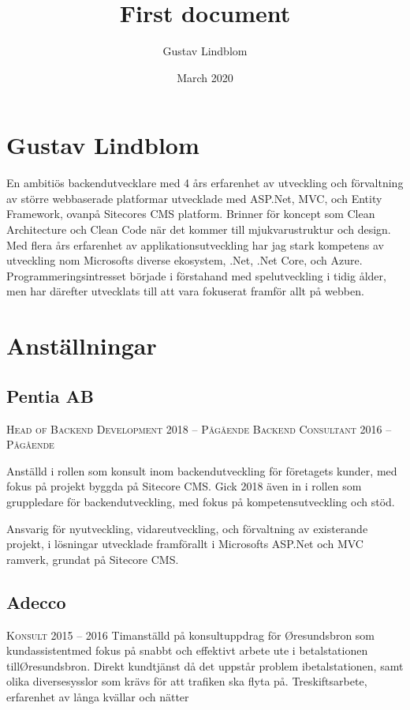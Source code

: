 \documentclass[usenames,dvipsnames]{article}
\title{First document}
\author{Gustav Lindblom}
\date{March 2020}
\begin{document}
\hspace{-1.6cm}\begin{minipage}[t]{0.65\textwidth}

\section*{\textcolor{NavyBlue}{Gustav Lindblom}}
\begin{flushleft}
En ambitiös backendutvecklare med 4 års erfarenhet av utveckling och förvaltning av större webbaserade platformar utvecklade med ASP.Net, MVC, och Entity Framework, ovanpå Sitecores CMS platform. Brinner för koncept som Clean Architecture och Clean Code när det kommer till mjukvarustruktur och design. Med flera års erfarenhet av applikationsutveckling har jag stark kompetens av utveckling nom Microsofts diverse ekosystem, .Net, .Net Core, och Azure.\break
Programmeringsintresset började i förstahand med spelutveckling i tidig ålder, men har därefter utvecklats till att vara fokuserat framför allt på webben.
\end{flushleft}

\section*{\textcolor{NavyBlue}{Anställningar}}
\subsection*{\textcolor{NavyBlue}{Pentia AB}}
\begin{flushleft}
\textsc{Head of Backend Development 2018 -- Pågående}\break
\textsc{Backend Consultant 2016 -- Pågående}\break 
\par Anställd i rollen som konsult inom backendutveckling för företagets kunder, med fokus på projekt byggda på Sitecore CMS. Gick 2018 även in i rollen som gruppledare för backendutveckling, med fokus på kompetensutveckling och stöd.
\par Ansvarig för nyutveckling, vidareutveckling, och förvaltning av existerande projekt, i lösningar utvecklade framförallt i Microsofts ASP.Net och MVC ramverk, grundat på Sitecore CMS.
\end{flushleft}

\subsection*{\textcolor{NavyBlue}{Adecco}}
\begin{flushleft}
\textsc{Konsult 2015 -- 2016}\break
Timanställd på konsultuppdrag för Øresundsbron som kundassistentmed fokus på snabbt och effektivt arbete ute i betalstationen tillØresundsbron. Direkt kundtjänst då det uppstår problem ibetalstationen, samt olika diversesysslor som krävs för att trafiken ska
flyta på. Treskiftsarbete, erfarenhet av långa kvällar och nätter
\end{flushleft}


\end{minipage}
\end{document}
